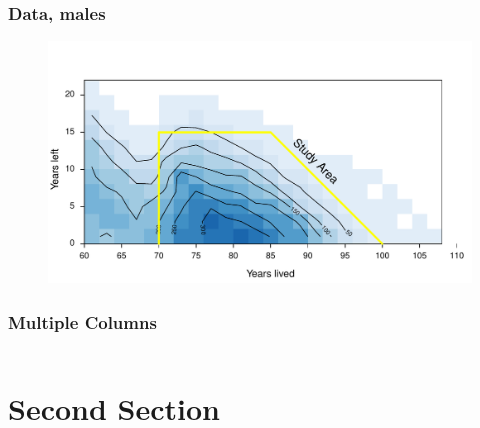 \documentclass{beamer}
\begin{document}

\begin{frame}
\frametitle{Data, males}
\begin{figure}
\includegraphics[width=\linewidth]{Figures/CaseCountMales}
\end{figure}
\end{frame}


\begin{frame}

\end{frame}


\begin{frame}
\frametitle{Multiple Columns}
\begin{columns}[c] %


\end{columns}
\end{frame}

\section{Second Section}

\end{document}
